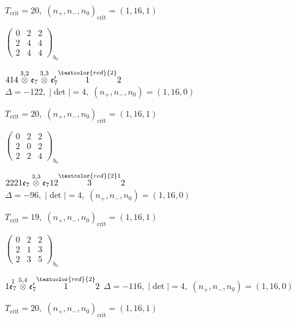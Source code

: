 \documentclass[10pt]{article}
\begin{document}
\hspace{1em}$T_{\text{crit}}=20,\; (n_+,n_-,n_0)_{\text{crit}}=(1,16,1)$

\hspace{2em}$\left(\begin{smallmatrix}0 & 2 & 2 \\ 2 & 4 & 4 \\ 2 & 4 & 4\end{smallmatrix}\right)_{\!b_0}$

\smallskip

$414\overset{3,2}{\otimes}\mathfrak{e}_7\overset{3,3}{\otimes}\mathfrak{e}_7'\overset{\textcolor{red}{2}}{1}2$ \quad $\Delta=-122,\; |\det|=4,\; (n_+,n_-,n_0)=(1,16,0)$

\hspace{1em}$T_{\text{crit}}=20,\; (n_+,n_-,n_0)_{\text{crit}}=(1,16,1)$

\hspace{2em}$\left(\begin{smallmatrix}0 & 2 & 2 \\ 2 & 0 & 2 \\ 2 & 2 & 4\end{smallmatrix}\right)_{\!b_0}$

\smallskip

$2221\mathfrak{e}_7\overset{3,3}{\otimes}\mathfrak{e}_712\overset{\textcolor{red}{2}1}{3}2$ \quad $\Delta=-96,\; |\det|=4,\; (n_+,n_-,n_0)=(1,16,0)$

\hspace{1em}$T_{\text{crit}}=19,\; (n_+,n_-,n_0)_{\text{crit}}=(1,16,1)$

\hspace{2em}$\left(\begin{smallmatrix}0 & 2 & 2 \\ 2 & 1 & 3 \\ 2 & 3 & 5\end{smallmatrix}\right)_{\!b_0}$

\smallskip

$1\overset{1}{\mathfrak{e}_7}\overset{5,4}{\otimes}\mathfrak{e}_7'\overset{\textcolor{red}{2}}{1}2$ \quad $\Delta=-116,\; |\det|=4,\; (n_+,n_-,n_0)=(1,16,0)$

\hspace{1em}$T_{\text{crit}}=20,\; (n_+,n_-,n_0)_{\text{crit}}=(1,16,1)$
\end{document}
